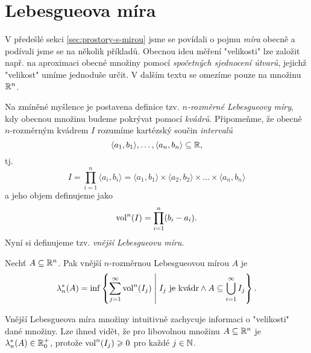 \section{Lebesgueova míra}\label{sec:lebesgueova-mira}


V předešlé sekci \ref{sec:prostory-s-mirou} jsme se povídali o pojmu \emph{míra} obecně a podívali jsme se na několik příkladů. Obecnou ideu měření "velikosti" lze založit např. na aproximaci obecné množiny pomocí \emph{spočetných sjednocení útvarů}, jejichž "velikost" umíme jednoduše určit. V dalším textu se omezíme pouze na množinu $\mathbb{R}^n$.

Na zmíněné myšlence je postavena definice tzv. \emph{$n$-rozměrné Lebesgueovy míry}, kdy obecnou množinu budeme pokrývat pomocí \emph{kvádrů}. Připomeňme, že obecně \mbox{$n$-rozměrným} kvádrem $I$ rozumíme kartézský součin \emph{intervalů}
\[\langle a_1,b_1\rangle,\ldots,\langle a_n,b_n\rangle\subseteq\mathbb{R},\]
tj.
\[I=\prod_{i=1}^{n}\langle a_i,b_i\rangle=\langle a_1,b_1\rangle\times\langle a_2,b_2\rangle\times\dots\times\langle a_n,b_n\rangle\]
a jeho objem definujeme jako
\[\operatorname{vol}^n(I)=\prod_{i=1}^{n}(b_i-a_i).\]
Nyní si definujeme tzv. \emph{vnější Lebesgueovu míru}.
\begin{definition}\label{def:vnejsi-lebegueova-mira}
    Nechť $A\subseteq\mathbb{R}^n$. Pak vnější $n$-rozměr\-nou Lebesgueovou mírou $A$ je
    \[\lambda_n^*(A)=\inf\left\{\sum_{j=1}^{\infty}\operatorname{vol}^n(I_j)\;\middle|\;\text{$I_j$ je kvádr}\land A\subseteq\bigcup_{i=1}^\infty I_j\right\}.\]
\end{definition}
Vnější Lebesgueova míra množiny intuitivně zachycuje informaci o "velikosti" dané množiny.  Lze ihned vidět, že pro libovolnou množinu $A\subseteq\mathbb{R}^n$ je $\lambda_n^*(A)\in\mathbb{R}_0^+$, protože $\operatorname{vol}^n(I_j)\geqslant0$ pro každé $j\in\mathbb{N}$.
